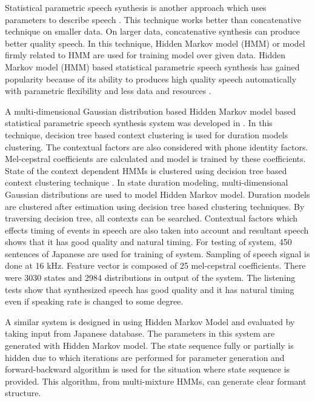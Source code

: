 Statistical parametric speech synthesis is another approach which uses parameters to describe
speech \cite{king2010beginners}. This technique works better than
concatenative technique on smaller data. On larger data, concatenative synthesis can produce better quality speech. In this technique, Hidden Markov model (HMM) or model firmly related to HMM are used for training model over given data. Hidden Markov model (HMM) based statistical parametric speech synthesis has gained popularity because of its ability to produces high quality speech automatically with parametric flexibility and less data and resources \cite{black2007statistical}.

A multi-dimensional Gaussian distribution based Hidden Markov model based statistical parametric speech synthesis system was developed in
\cite{yoshimura1998duration}.  In this technique, decision tree based context clustering is used for duration models clustering. The contextual factors are also considered with phone identity factors. Mel-cepstral coefficients are
calculated and model is trained by these coefficients. State of the context dependent HMMs is clustered using decision tree based
context clustering technique \cite{odellj.j1995}. In state duration modeling, multi-dimensional Gaussian distributions are
used to model Hidden Markov model. Duration models are clustered after estimation using decision tree based clustering techniques. 
By traversing decision tree, all contexts can be searched. Contextual factors which effects timing of
events in speech are also taken into account and resultant speech shows that it has good quality and natural timing. For testing
of system, 450 sentences of Japanese are used for training of system. Sampling of speech signal is done at 16 kHz. Feature
vector is composed of 25 mel-cepstral coefficients. There were 3030 states and 2984 distributions in output of the system.
The listening tests show that synthesized speech has good quality and it has natural timing even if speaking rate is changed to
some degree.

A similar system is designed in \cite{tokuda2000speech} using Hidden Markov Model and evaluated by taking input
from Japanese database. The parameters in this system are generated with Hidden
Markov model. The state sequence fully or partially is hidden due to which iterations are performed for parameter generation and
forward-backward algorithm is used for the situation where state sequence is provided. This algorithm, from multi-mixture HMMs,
can generate clear formant structure.

